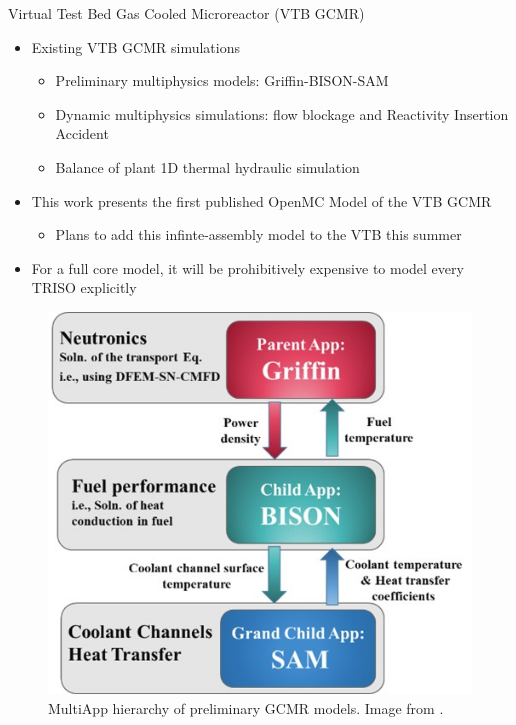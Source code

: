 \documentclass[9pt,t,aspectratio=169]{beamer}
\begin{document}
\begin{frame}{Virtual Test Bed Gas Cooled Microreactor (VTB GCMR)}
    \begin{minipage}[t]{0.45\linewidth}
        \begin{itemize}
            \item Existing VTB GCMR simulations
            \begin{itemize}
                \item Preliminary multiphysics models: Griffin-BISON-SAM \cite{Stauff-preliminary-applications-2021,Stauff-applications-2022,Abdelhameed-ANS-2022}
                \item Dynamic multiphysics simulations: flow blockage and Reactivity Insertion Accident \cite{HF_MRs_ANL}
                \item Balance of plant 1D thermal hydraulic simulation \cite{Duchnowski_plant_balance_2022}
            \end{itemize}
            \item This work presents the first published OpenMC Model of the VTB GCMR
            \begin{itemize}
                \item Plans to add this infinte-assembly model to the VTB this summer
            \end{itemize}
            \item For a full core model, it will be prohibitively expensive to model every TRISO explicitly
        \end{itemize}
    \end{minipage}
    \hfill%
    \begin{minipage}[t]{0.45\linewidth}
        \begin{figure}
            \centering
            \includegraphics[width=0.875\linewidth]{figures/gcmr_preliminary_mutliapps.png}
            \caption{MultiApp hierarchy of preliminary GCMR models. Image from \cite{Abdelhameed-ANS-2022}.}
        \end{figure}
    \end{minipage}

\end{frame}
\end{document}

